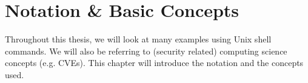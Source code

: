 \chapter{Notation \& Basic Concepts}\label{chapter:notation}
Throughout this thesis, we will look at many examples using Unix shell commands. We will also be referring to (security related) computing science concepts (e.g. CVEs). This chapter will introduce the notation and the concepts used.





